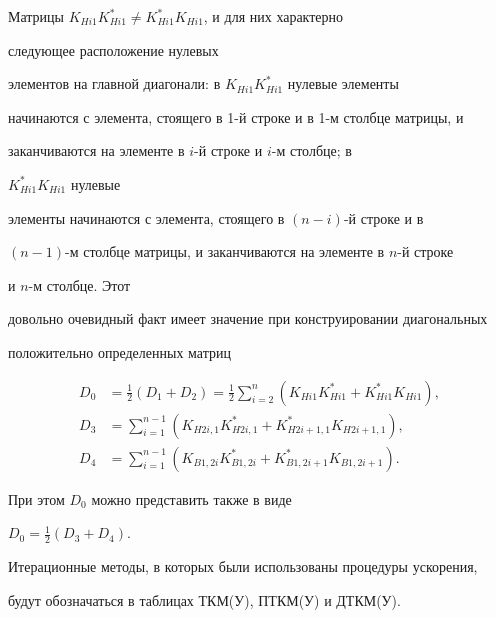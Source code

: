  


Матрицы $K_{Hi1}K^*_{Hi1}\ne K^*_{Hi1}K_{Hi1}$, и для них характерно 


следующее расположение нулевых 


элементов на главной диагонали: в $K_{Hi1}K^*_{Hi1}$ нулевые элементы 


начинаются с элемента, стоящего в 1-й строке и в 1-м столбце матрицы, и 


заканчиваются на элементе в $i$-й строке и $i$-м столбце; в 


$K^*_{Hi1}K_{Hi1}$ нулевые 


элементы начинаются с элемента, стоящего в $(n{-}i)$-й строке и в 


$(n{-}1)$-м столбце матрицы, и заканчиваются на элементе в $n$-й строке 


и $n$-м столбце. Этот 


довольно очевидный факт имеет значение при конструировании диагональных 


положительно определенных матриц 


\begin{align*} 


D_0&=\frac{1}{2}(D_1+D_2)=\frac{1}{2}\sum^n_{i=2} 


(K_{Hi1}K^*_{Hi1}+K^*_{Hi1}K_{Hi1}),\\ 


% 


D_3&=\sum^{n-1}_{i=1}(K_{H2i,1}K^*_{H2i,1}+ 


K^*_{H2i+1,1}K_{H2i+1,1}), \\ 


% 


D_4&=\sum^{n-1}_{i=1}(K_{B1,2i}K^*_{B1,2i}+ 


K^*_{B1,2i+1}K_{B1,2i+1}). 


\end{align*} 


При этом $D_0$ можно представить также в виде 


$D_0=\frac{1}{2}(D_3+D_4)$. 


 


Итерационные методы, в которых были использованы процедуры ускорения,


будут обозначаться в таблицах ТКМ(У), ПТКМ(У) и ДТКМ(У). 




 


